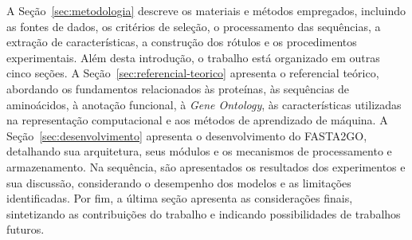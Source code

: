 A Seção~\ref{sec:metodologia} descreve os materiais e métodos empregados, incluindo as fontes de dados, os critérios de seleção, o processamento das sequências, a extração de características, a construção dos rótulos e os procedimentos experimentais. 
Além desta introdução, o trabalho está organizado em outras cinco seções. 
A Seção~\ref{sec:referencial-teorico} apresenta o referencial teórico, abordando os fundamentos relacionados às proteínas, às sequências de aminoácidos, à anotação funcional, à \textit{Gene Ontology}, às características utilizadas na representação computacional e aos métodos de aprendizado de máquina. 
A Seção~\ref{sec:desenvolvimento} apresenta o desenvolvimento do FASTA2GO, detalhando sua arquitetura, seus módulos e os mecanismos de processamento e armazenamento. Na sequência, são apresentados os resultados dos experimentos e sua discussão, considerando o desempenho dos modelos e as limitações identificadas. Por fim, a última seção apresenta as considerações finais, sintetizando as contribuições do trabalho e indicando possibilidades de trabalhos futuros.